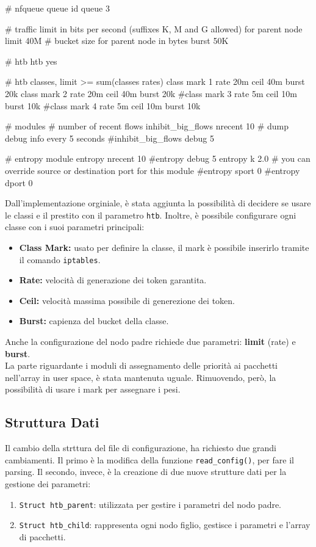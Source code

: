 \begin{donper}
# nfqueue queue id
queue 3

# traffic limit in bits per second (suffixes K, M and G allowed) for parent node
limit 40M
# bucket size for parent node in bytes
burst 50K

# htb
htb yes

# htb classes, limit >= sum(classes rates)
class mark 1 rate 20m ceil 40m burst 20k
class mark 2 rate 20m ceil 40m burst 20k
#class mark 3 rate 5m  ceil 10m burst 10k
#class mark 4 rate 5m  ceil 10m burst 10k

# modules
# number of recent flows
inhibit_big_flows nrecent 10
# dump debug info every 5 seconds
#inhibit_big_flows debug 5

# entropy module
entropy nrecent 10
#entropy debug 5
entropy k 2.0
# you can override source or destination port for this module
#entropy sport 0
#entropy dport 0
\end{donper}

Dall'implementazione orginiale, è stata aggiunta la possibilità di decidere se usare le classi e il prestito con il parametro \texttt{htb}.
Inoltre, è possibile configurare ogni classe con i suoi parametri principali:
\begin{itemize}
\item \textbf{Class Mark:} usato per definire la classe, il mark è possibile inserirlo tramite il comando \texttt{iptables}.
\item \textbf{Rate:} velocità di generazione dei token garantita.
\item \textbf{Ceil:} velocità massima possibile di generezione dei token.
\item \textbf{Burst:} capienza del bucket della classe.
\end{itemize}
Anche la configurazione del nodo padre richiede due parametri: \textbf{limit} (rate) e \textbf{burst}. \\
\vspace*{0.01\textheight}
La parte riguardante i moduli di assegnamento delle priorità ai pacchetti nell'array in user space, è stata mantenuta uguale.
Rimuovendo, però, la possibilità di usare i mark per assegnare i pesi.

\subsection{Struttura Dati}
Il cambio della strttura del file di configurazione, ha richiesto due grandi cambiamenti.
Il primo è la modifica della funzione \texttt{read\_config()}, per fare il parsing.
Il secondo, invece, è la creazione di due nuove strutture dati per la gestione dei parametri: 
\begin{enumerate}
  \item \texttt{Struct htb\_parent}: utilizzata per gestire i parametri del nodo padre.
  \item \texttt{Struct htb\_child}: rappresenta ogni nodo figlio, gestisce i parametri e l'array di pacchetti.
\end{enumerate}

